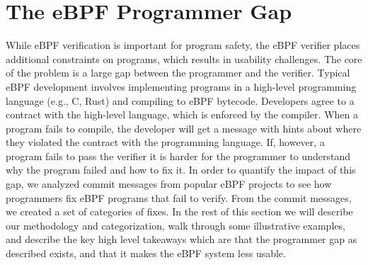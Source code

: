 \section{The eBPF Programmer Gap}
\label{sec:motivation}

While eBPF verification is important for program safety, the eBPF verifier
    places additional constraints on programs, which results in usability challenges.
The core of the problem is a large gap between the programmer and the
    verifier.
Typical eBPF development involves implementing programs in a high-level
    programming language (e.g., C, Rust) and compiling to eBPF bytecode.
Developers agree to a contract with the high-level language, which is
    enforced by the compiler.
When a program fails to compile, the developer will get a message with
    hints about where they violated
    the contract with the programming language.
If, however, a program fails to pass the verifier it is harder for the programmer
    to understand why the program failed and how to fix it.
In order to quantify the impact of this gap,
    we analyzed commit messages from popular eBPF projects to see how programmers fix
    eBPF programs that fail to verify.
From the commit messages, we created a set of categories of fixes.
In the rest of this section we will describe our methodology and categorization, walk through some illustrative examples, and describe the key high level takeaways which are that the programmer gap as described exists, and that it makes the eBPF system less usable.




%

